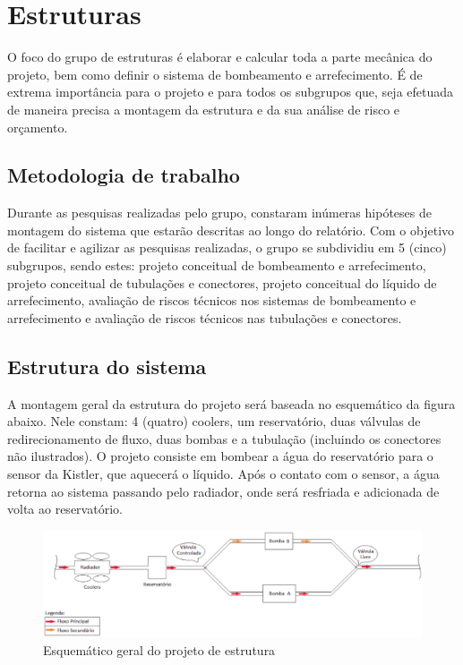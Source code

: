 \section{Estruturas}

O foco do grupo de estruturas é elaborar e calcular toda a parte mecânica do projeto, bem como definir o sistema de bombeamento e arrefecimento. É de extrema importância para o projeto e para todos os subgrupos que, seja efetuada de maneira precisa a montagem da estrutura e da sua análise de risco e orçamento.

\subsection{Metodologia de trabalho}

Durante as pesquisas realizadas pelo grupo, constaram inúmeras hipóteses de montagem do sistema que estarão descritas ao longo do relatório. Com o objetivo de facilitar e agilizar as pesquisas realizadas, o grupo se subdividiu em 5 (cinco) subgrupos, sendo estes: projeto conceitual de bombeamento e arrefecimento, projeto conceitual de tubulações e conectores, projeto conceitual do líquido de arrefecimento, avaliação de riscos técnicos nos sistemas de bombeamento e arrefecimento e avaliação de riscos técnicos nas tubulações e conectores. 

\subsection{Estrutura do sistema}

A montagem geral da estrutura do projeto será baseada no esquemático da figura abaixo. Nele constam: 4 (quatro) coolers, um reservatório, duas válvulas de redirecionamento de fluxo, duas bombas e a tubulação (incluindo os conectores não ilustrados). O projeto consiste em bombear a água do reservatório para o sensor da Kistler, que aquecerá o líquido. Após o contato com o sensor, a água retorna ao sistema passando pelo radiador, onde será resfriada e adicionada de volta ao reservatório.

\begin{figure}[!htb]                                                               
   \centering                                                                      
   \includegraphics[width=15cm, keepaspectratio=true]{figuras/projetoestrutural.eps}
   \caption{Esquemático geral do projeto de estrutura}                        
\end{figure}


